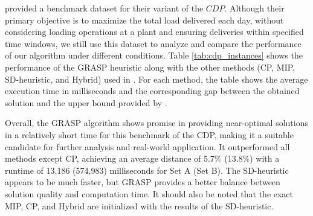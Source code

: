 \documentclass{article}
\begin{document}
\cite{kinable2014concrete} provided a benchmark dataset for their variant of the $CDP$. Although their primary objective is to maximize the total load delivered each day, without considering loading operations at a plant and ensuring deliveries within specified time windows, we still use this dataset to analyze and compare the performance of our algorithm under different conditions. Table \ref*{tab:cdp_instances} shows the performance of the GRASP heuristic along with the other methods (CP, MIP, SD-heuristic, and Hybrid) used in \cite{kinable2014concrete}.  For each method, the table shows the average execution time in milliseconds and the corresponding gap between the obtained solution and the upper bound provided by \cite{kinable2014concrete}.

\begin{table}[htbp]
    \centering
    \caption{Performance of the GRASP heuristic on the CDP benchmark instances}
    \label{tab:cdp_instances}
    \scriptsize
\end{table}

Overall, the GRASP algorithm shows promise in providing near-optimal solutions in a relatively short time for this benchmark of the CDP, making it a suitable candidate for further analysis and real-world application. It outperformed all methods except CP, achieving an average distance of 5.7\% (13.8\%) with a runtime of 13,186 (574,983) milliseconds for Set A (Set B). The SD-heuristic appears to be much faster, but GRASP provides a better balance between solution quality and computation time. It should also be noted that the exact MIP, CP, and Hybrid are initialized with the results of the SD-heuristic.
\end{document}
